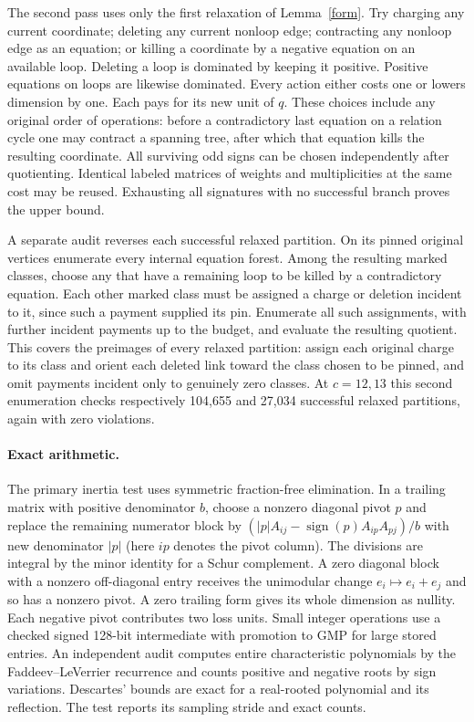 \documentclass[11pt]{article}
\begin{document}
The second pass uses only the first relaxation of Lemma~\ref{form}. Try charging any current coordinate; deleting any current nonloop edge; contracting any nonloop edge as an equation; or killing a coordinate by a negative equation on an available loop. Deleting a loop is dominated by keeping it positive. Positive equations on loops are likewise dominated. Every action either costs one or lowers dimension by one. Each pays for its new unit of $q$. These choices include any original order of operations: before a contradictory last equation on a relation cycle one may contract a spanning tree, after which that equation kills the resulting coordinate. All surviving odd signs can be chosen independently after quotienting. Identical labeled matrices of weights and multiplicities at the same cost may be reused. Exhausting all signatures with no successful branch proves the upper bound.

A separate audit reverses each successful relaxed partition. On its pinned original vertices enumerate every internal equation forest. Among the resulting marked classes, choose any that have a remaining loop to be killed by a contradictory equation. Each other marked class must be assigned a charge or deletion incident to it, since such a payment supplied its pin. Enumerate all such assignments, with further incident payments up to the budget, and evaluate the resulting quotient. This covers the preimages of every relaxed partition: assign each original charge to its class and orient each deleted link toward the class chosen to be pinned, and omit payments incident only to genuinely zero classes. At $c=12,13$ this second enumeration checks respectively 104,655 and 27,034 successful relaxed partitions, again with zero violations.


\paragraph{Exact arithmetic.} The primary inertia test uses symmetric fraction-free elimination. In a trailing matrix with positive denominator $b$, choose a nonzero diagonal pivot $p$ and replace the remaining numerator block by $(|p|A_{ij}-\operatorname{sign}(p)A_{ip}A_{pj})/b$ with new denominator $|p|$ (here $i p$ denotes the pivot column). The divisions are integral by the minor identity for a Schur complement. A zero diagonal block with a nonzero off-diagonal entry receives the unimodular change $e_i\mapsto e_i+e_j$ and so has a nonzero pivot. A zero trailing form gives its whole dimension as nullity. Each negative pivot contributes two loss units. Small integer operations use a checked signed 128-bit intermediate with promotion to GMP for large stored entries. An independent audit computes entire characteristic polynomials by the Faddeev--LeVerrier recurrence and counts positive and negative roots by sign variations. Descartes' bounds are exact for a real-rooted polynomial and its reflection. The test reports its sampling stride and exact counts.
\end{document}
